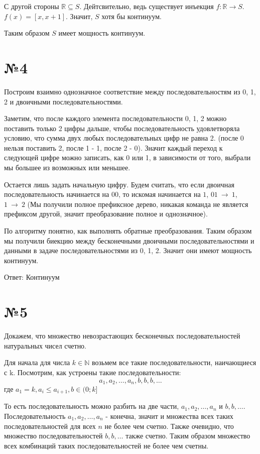 \documentclass[12pt]{article}
\newcommand{\real}{\mathbb{R}}
\begin{document}
	С другой стороны $\real \subseteq S$. Дейтсвительно, ведь существует инъекция $f: \real \to S$. 
	$f(x)=[x, x + 1]$. Значит, $S$ хотя бы континуум.
	
	Таким образом $S$ имеет мощность континуум.
	\section*{№4}
	Построим взаимно однозначное соответствие между последовательностям из 0, 1, 2 и двоичными последовательностями.
	
	Заметим, что после каждого элемента последовательности 0, 1, 2 можно поставить только 2 цифры дальше, чтобы последовательность удовлетворяла условию, что сумма двух любых последовательных цифр не равна 2. 
	(после 0 нельзя поставить 2, после 1 - 1, после 2 - 0). Значит каждый переход к следующей цифре можно записать, как 0 или 1, в зависимости от того, выбрали мы большее из возможных или меньшее. 
	
	Остается лишь задать начальную цифру. Будем считать, что если двоичная последовательность начинается 
	на $00$, то искомая начинается на $1$, $01~\to~1$, $1~\to~2$ (Мы получили полное префиксное дерево, 
	никакая команда не является префиксом другой, значит преобразование полное и однозначное). 
	
	По алгоритму понятно, как выполнять обратные преобразования. Таким образом мы получили биекцию между бесконечными двоичными последовательностями и данными в задаче последовательностями из 0, 1, 2. Значит они имеют мощность континуум.
	
	Ответ: Континуум
	
	\section*{№5}
	Докажем, что множество невозрастающих бесконечных последовательностей натуральных чисел счетно.
	
	Для начала для числа $k \in \mathbb{N}$ возьмем все такие последовательности, наичающиеся с k. Посмотрим, как устроены такие последовательности:
	$$a_1, a_2, \dots, a_n, b, b, b, \dots$$
	где 	$a_1 = k, a_i \leqslant a_{i+1}, b \in (0; k]$
	
	То есть последовательность можно разбить на две части, $a_1, a_2, \dots, a_n$ и $b, b, \dots$. Последовательность $a_1, a_2, \dots, a_n$ - конечна, значит и множества всех таких последовательностей для всех $n$ не более чем счетно. Также очевидно, что множество последовательностей $b, b, \dots$ также счетно. Таким образом множество всех комбинаций таких последовательностей не более чем счетны.
	
\end{document}

